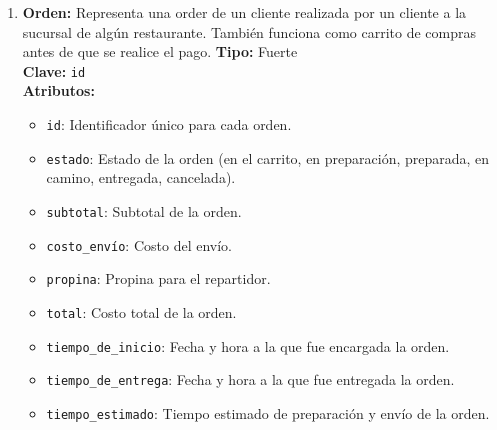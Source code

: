 \begin{enumerate}
    \item \textbf{Orden:} Representa una order de un cliente realizada por un cliente a la sucursal de algún restaurante. También funciona como carrito de compras antes de que se realice el pago.
    \textbf{Tipo:} Fuerte \\
    \textbf{Clave:} \texttt{id} \\
    \textbf{Atributos:}
    \begin{itemize}
        \item \texttt{id}: Identificador único para cada orden.
        \item \texttt{estado}: Estado de la orden (en el carrito, en preparación, preparada, en camino, entregada, cancelada).
        \item \texttt{subtotal}: Subtotal de la orden.
        \item \texttt{costo\_envío}: Costo del envío.
        \item \texttt{propina}: Propina para el repartidor.
        \item \texttt{total}: Costo total de la orden.
        \item \texttt{tiempo\_de\_inicio}: Fecha y hora a la que fue encargada la orden.
        \item \texttt{tiempo\_de\_entrega}: Fecha y hora a la que fue entregada la orden.
        \item \texttt{tiempo\_estimado}: Tiempo estimado de preparación y envío de la orden.
    \end{itemize}
\end{enumerate}

